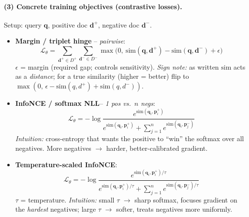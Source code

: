 \documentclass{article}
\begin{document}
\paragraph{(3) Concrete training objectives (contrastive losses).}
Setup: query $\mathbf{q}$, positive doc $\mathbf{d}^+$, negative doc $\mathbf{d}^-$.
\begin{itemize}
    \item \textbf{Margin / triplet hinge} -- \emph{pairwise}:
    $$\mathcal{L}_\theta = \sum_{\mathbf{d}^+\in D^+}\sum_{\mathbf{d}^-\in D^-}\max\!\big(0,\ \mathrm{sim}(\mathbf{q},\mathbf{d}^+)-\mathrm{sim}(\mathbf{q},\mathbf{d}^-)+\epsilon\big)$$
    $\epsilon$ = margin (required gap; controls sensitivity). \emph{Sign note:} as written $\mathrm{sim}$ acts as a \emph{distance}; for a true similarity (higher = better) flip to $\max(0,\,\epsilon-\mathrm{sim}(q,d^+)+\mathrm{sim}(q,d^-))$.
    \item \textbf{InfoNCE / softmax NLL}-- \emph{1 pos vs.\ $n$ negs}:
    $$\mathcal{L}_\theta = -\log\frac{e^{\mathrm{sim}(\mathbf{q}_i,\mathbf{p}_i^+)}}{e^{\mathrm{sim}(\mathbf{q}_i,\mathbf{p}_i^+)}+\sum_{j=1}^{n}e^{\mathrm{sim}(\mathbf{q}_i,\mathbf{p}_j^-)}}$$
    \emph{Intuition:} cross-entropy that wants the positive to ``win'' the softmax over all negatives. More negatives $\to$ harder, better-calibrated gradient.
    \item \textbf{Temperature-scaled InfoNCE}:
    $$\mathcal{L}_\theta = -\log\frac{e^{\mathrm{sim}(\mathbf{q}_i,\mathbf{p}_i^+)/\tau}}{e^{\mathrm{sim}(\mathbf{q}_i,\mathbf{p}_i^+)/\tau}+\sum_{j=1}^{n}e^{\mathrm{sim}(\mathbf{q}_i,\mathbf{p}_j^-)/\tau}}$$
    $\tau$ = temperature. \emph{Intuition:} small $\tau$ $\to$ sharp softmax, focuses gradient on the \emph{hardest} negatives; large $\tau$ $\to$ softer, treats negatives more uniformly.
\end{itemize}
\end{document}
